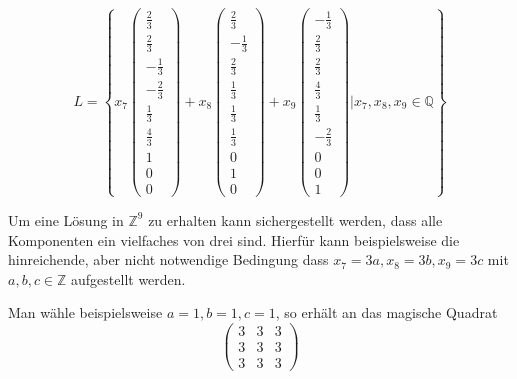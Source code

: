 \[
  L = \left\{
  x_7\begin{pmatrix}
    \frac{2}{3}   \\
    \frac{2}{3}   \\
    - \frac{1}{3} \\
    - \frac{2}{3} \\
    \frac{1}{3}   \\
    \frac{4}{3}   \\
    1             \\
    0             \\
    0
  \end{pmatrix} + x_8\begin{pmatrix}
    \frac{2}{3}  \\
    -\frac{1}{3} \\
    \frac{2}{3}  \\
    \frac{1}{3}  \\
    \frac{1}{3}  \\
    \frac{1}{3}  \\
    0            \\
    1            \\
    0
  \end{pmatrix} + x_9\begin{pmatrix}
    - \frac{1}{3} \\
    \frac{2}{3}   \\
    \frac{2}{3}   \\
    \frac{4}{3}   \\
    \frac{1}{3}   \\
    - \frac{2}{3} \\
    0             \\
    0             \\
    1
  \end{pmatrix} \Bigg| x_7, x_8, x_9 \in \mathbb{Q}
  \right\}
\]

Um eine Lösung in $\mathbb{Z}^9$ zu erhalten kann sichergestellt werden, dass
alle Komponenten ein vielfaches von drei sind. Hierfür kann beispielsweise die
hinreichende, aber nicht notwendige Bedingung dass $x_7 = 3a, x_8 = 3b, x_9 =
  3c$ mit $a, b, c \in \mathbb{Z}$ aufgestellt werden.

Man wähle beispielsweise $a = 1, b = 1, c = 1$, so erhält an das magische
Quadrat
\[
  \begin{pmatrix}
    3 & 3 & 3 \\ 3 & 3 & 3 \\ 3 & 3 & 3
  \end{pmatrix}
\]

